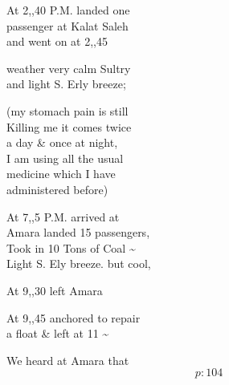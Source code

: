 \documentclass{report}
\begin{document}
	\par{
 	At 2,,40 P.M. landed one\ \\passenger at Kalat Saleh\ \\and went on at 2,,45\ \\
	}

	\par{
 	weather very calm Sultry\ \\and light S. Erly breeze;\ \\
	}

	\par{
 	(my stomach pain is still\ \\Killing me it comes twice\ \\a day \& once at night,\ \\I am using all the usual\ \\medicine which I have\ \\administered before)\ \\
	}

	\par{
 	At 7,,5 P.M. arrived at\ \\Amara landed 15 passengers,\ \\Took in 10 Tons of Coal \~{}\ \\Light S. Ely breeze. but cool,\ \\
	}

	\par{
 	At 9,,30 left Amara\ \\
	}

	\par{
 	At 9,,45 anchored to repair\ \\a float \& left at 11 \~{}\ \\
	}

	\par{
 	We heard at Amara that\ \\
  \[p: 104 \]

	}



\end{document}
